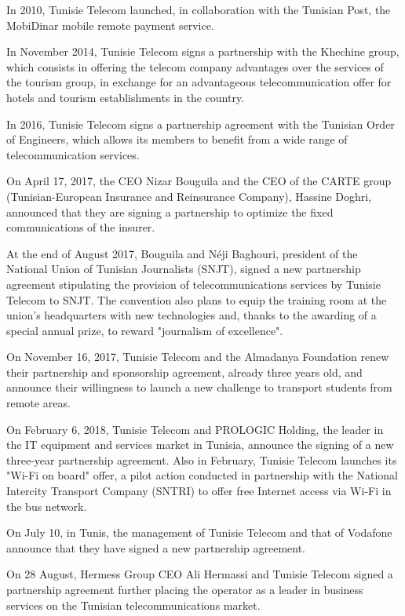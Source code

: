 In 2010, Tunisie Telecom launched, in collaboration with the Tunisian Post, the MobiDinar mobile remote payment service.

In November 2014, Tunisie Telecom signs a partnership with the Khechine group, which consists in offering the telecom company advantages over the services of the tourism group, in exchange for an advantageous telecommunication offer for hotels and tourism establishments in the country.

In 2016, Tunisie Telecom signs a partnership agreement with the Tunisian Order of Engineers, which allows its members to benefit from a wide range of telecommunication services.

On April 17, 2017, the CEO Nizar Bouguila and the CEO of the CARTE group (Tunisian-European Insurance and Reinsurance Company), Hassine Doghri, announced that they are signing a partnership to optimize the fixed communications of the insurer.

At the end of August 2017, Bouguila and Néji Baghouri, president of the National Union of Tunisian Journalists (SNJT), signed a new partnership agreement stipulating the provision of telecommunications services by Tunisie Telecom to SNJT. 
The convention also plans to equip the training room at the union's headquarters with new technologies and, thanks to the awarding of a special annual prize, to reward "journalism of excellence".

On November 16, 2017, Tunisie Telecom and the Almadanya Foundation renew their partnership and sponsorship agreement, already three years old, and announce their willingness to launch a new challenge to transport students from remote areas.

On February 6, 2018, Tunisie Telecom and PROLOGIC Holding, the leader in the IT equipment and services market in Tunisia, announce the signing of a new three-year partnership agreement. Also in February, Tunisie Telecom launches its "Wi-Fi on board" offer, a pilot action conducted in partnership with the National Intercity Transport Company (SNTRI) to offer free Internet access via Wi-Fi in the bus network.

On July 10, in Tunis, the management of Tunisie Telecom and that of Vodafone announce that they have signed a new partnership agreement.

On 28 August, Hermess Group CEO Ali Hermassi and Tunisie Telecom signed a partnership agreement further placing the operator as a leader in business services on the Tunisian telecommunications market.

